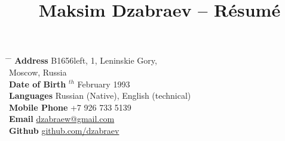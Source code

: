 \documentclass[10pt]{article} %
\begin{document}

\title{Maksim Dzabraev -- Résumé} %


\parbox{0.5\textwidth}{ %
\begin{tabbing} %
\hspace{3cm} \= \hspace{4cm} \= \kill %
{\bf Address} \> B1656left, 1, Leninskie Gory,\\ %
\> Moscow, Russia \\ %
{\bf Date of Birth} $^{th}$ February 1993 \\ %
{\bf Languages} \> Russian (Native), English (technical)\\ %
{\bf Mobile Phone} \> +7 926 733 5139 \\ %
{\bf Email} \> \href{mailto:dzabraew@gmail.com}{dzabraew@gmail.com} \\ %
{\bf Github} \> \href{https://github.com/dzabraev}{github.com/dzabraev} \\ %
\end{tabbing}}
\hfill %
\end{document}

